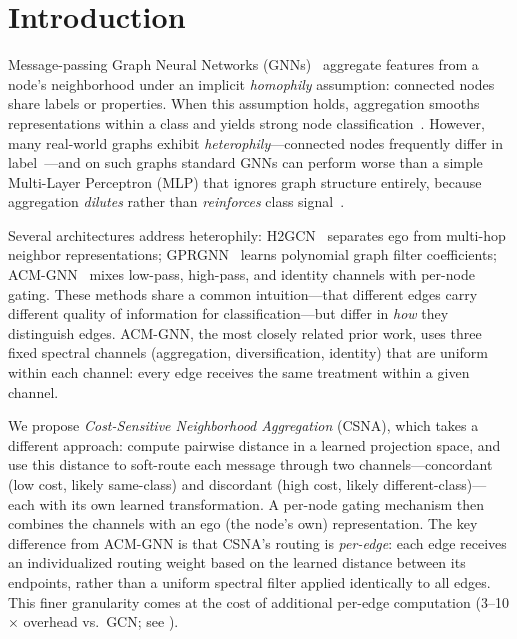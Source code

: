 \documentclass[runningheads]{llncs}
\begin{document}
\section{Introduction}\label{sec:intro}

Message-passing Graph Neural Networks (GNNs)~\cite{kipf2017semi,velickovic2018graph,hamilton2017inductive} aggregate features from a node's neighborhood under an implicit \emph{homophily} assumption: connected nodes share labels or properties.
When this assumption holds, aggregation smooths representations within a class and yields strong node classification~\cite{wu2020comprehensive}.
However, many real-world graphs exhibit \emph{heterophily}---connected nodes frequently differ in label~\cite{pei2020geom,zhu2020beyond}---and on such graphs standard GNNs can perform worse than a simple Multi-Layer Perceptron (MLP) that ignores graph structure entirely, because aggregation \emph{dilutes} rather than \emph{reinforces} class signal~\cite{zhu2020beyond}.

Several architectures address heterophily: H2GCN~\cite{zhu2020beyond} separates ego from multi-hop neighbor representations; GPRGNN~\cite{chien2021adaptive} learns polynomial graph filter coefficients; ACM-GNN~\cite{luan2022revisiting} mixes low-pass, high-pass, and identity channels with per-node gating.
These methods share a common intuition---that different edges carry different quality of information for classification---but differ in \emph{how} they distinguish edges.
ACM-GNN, the most closely related prior work, uses three fixed spectral channels (aggregation, diversification, identity) that are uniform within each channel: every edge receives the same treatment within a given channel.

We propose \emph{Cost-Sensitive Neighborhood Aggregation} (CSNA), which takes a different approach: compute pairwise distance in a learned projection space, and use this distance to soft-route each message through two channels---concordant (low cost, likely same-class) and discordant (high cost, likely different-class)---each with its own learned transformation.
A per-node gating mechanism then combines the channels with an ego (the node's own) representation.
The key difference from ACM-GNN is that CSNA's routing is \emph{per-edge}: each edge receives an individualized routing weight based on the learned distance between its endpoints, rather than a uniform spectral filter applied identically to all edges.
This finer granularity comes at the cost of additional per-edge computation (3--10$\times$ overhead vs.\ GCN; see ).
\end{document}
